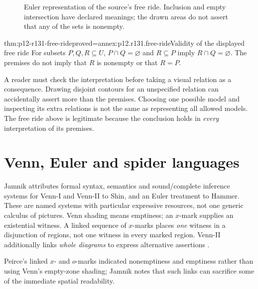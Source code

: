 \begin{figure}[htbp]
\centering
{}
\caption{Euler representation of the source's free ride. Inclusion and
empty intersection have declared meanings; the drawn areas do not
assert that any of the sets is nonempty.}
\label{fig:p12-r131-euler}
\end{figure}

\begin{hbtheorem}{thm:p12-r131-free-ride}{proved=annex:p12.r131.free-ride}{Validity of the displayed free ride}
For subsets \(P,Q,R\subseteq U\),
\(P\cap Q=\varnothing\) and \(R\subseteq P\) imply
\(R\cap Q=\varnothing\). The premises do not imply that \(R\)
is nonempty or that \(R=P\).
\end{hbtheorem}

A reader must check the interpretation before taking a visual relation
as a consequence. Drawing disjoint contours for an unspecified relation
can accidentally assert more than the premises. Choosing one possible
model and inspecting its extra relations is not the same as representing
all allowed models. The free ride above is legitimate because the
conclusion holds in \emph{every} interpretation of its premises.

\section{Venn, Euler and spider languages}

Jamnik attributes formal syntax, semantics and sound/complete inference
systems for Venn-I and Venn-II to Shin, and an Euler treatment to Hammer.
These are named systems with particular expressive resources, not
one generic calculus of pictures. Venn shading means emptiness; an
\(x\)-mark supplies an existential witness. A linked sequence of
\(x\)-marks places \emph{one} witness in a disjunction of regions,
not one witness in every marked region. Venn-II additionally links
\emph{whole diagrams} to express alternative assertions
\cite[pp.~717--718]{Jamnik2021LogicalDiagrams}.

Peirce's linked \(x\)- and \(o\)-marks indicated nonemptiness and
emptiness rather than using Venn's empty-zone shading; Jamnik notes
that such links can sacrifice some of the immediate spatial readability.

